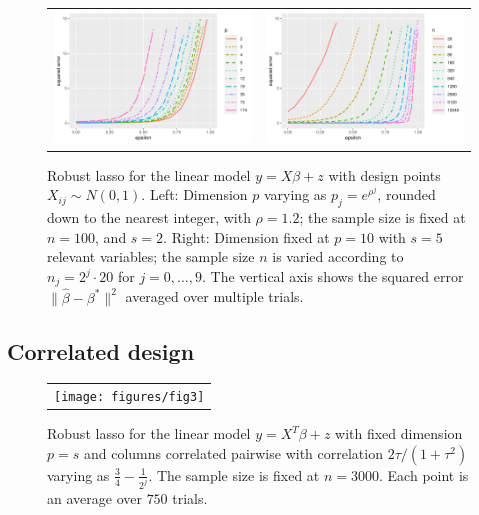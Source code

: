 \begin{figure}[t]
\vskip20pt
  \begin{center}
    \begin{tabular}{cc}
      \hskip-10pt
      \includegraphics[width=.48\textwidth]{figures/fig2a}&
      \includegraphics[width=.48\textwidth]{figures/fig2b}\\[-5pt]
    \end{tabular}
  \end{center}
\caption{Robust lasso for the linear model  $y=X\beta + z$ with design points $X_{ij}\sim N(0,1)$.
Left: Dimension $p$ varying as $p_{j} = e^{\rho^j}$, rounded down to the nearest integer, with $\rho=1.2$; the sample size is fixed at $n=100$, and $s=2$. Right: Dimension fixed at $p=10$ with $s=5$ relevant variables; the sample size $n$ is varied according to
$n_j = 2^j \cdot 20$ for $j=0,\ldots, 9$. The vertical axis shows the squared error $\|\hat \beta - \beta^*\|^2$ averaged over multiple trials.}
\label{fig:exp1}
\end{figure}

\subsection{Correlated design}

\begin{figure}[ht]
  \vskip20pt
    \begin{center}
      \begin{tabular}{c}
        \texttt{[image: figures/fig3]}
      \end{tabular}
    \end{center}
  \caption{Robust lasso for the linear model  $y=X^T\beta + z$ with 
  fixed dimension $p = s$ and columns correlated pairwise with correlation 
  $2\tau/(1+\tau^2)$ varying as $\frac{3}{4} - \frac{1}{2^j}$. The sample size is fixed at $n=3000$. Each point is an average over $750$ trials.}
  \end{figure}
  
